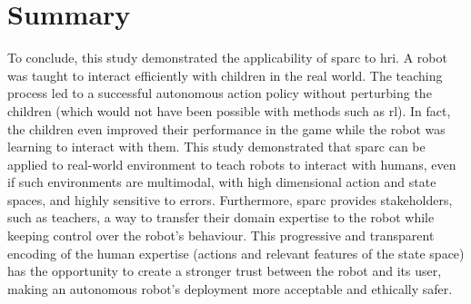 

\section{Summary}

%
%
%
%

To conclude, this study demonstrated the applicability of \gls{sparc} to \gls{hri}. A robot was taught to interact efficiently with children in the real world. The teaching process led to a successful autonomous action policy without perturbing the children (which would not have been possible with methods such as \gls{rl}). In fact, the children even improved their performance in the game while the robot was learning to interact with them. This study demonstrated that \gls{sparc} can be applied to real-world environment to teach robots to interact with humans, even if such environments are multimodal, with high dimensional action and state spaces, and highly sensitive to errors. Furthermore, \gls{sparc} provides stakeholders, such as teachers, a way to transfer their domain expertise to the robot while keeping control over the robot's behaviour. This progressive and transparent encoding of the human expertise (actions and relevant features of the state space) has the opportunity to create a stronger trust between the robot and its user, making an autonomous robot's deployment more acceptable and ethically safer.

